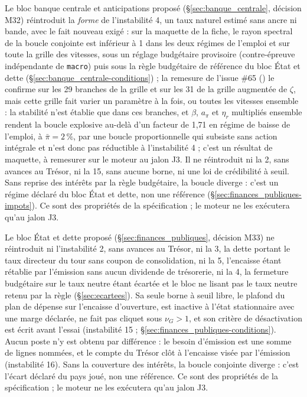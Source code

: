 \documentclass[11pt,a4paper]{article}
\newcommand{\code}[1]{\texttt{\detokenize{#1}}}
\begin{document}
Le bloc banque centrale et anticipations proposé (\S\ref{sec:banque_centrale}, décision M32) réintroduit la \emph{forme} de l'instabilité 4, un taux naturel estimé sans ancre ni bande, avec le fait nouveau exigé : sur la maquette de la fiche, le rayon spectral de la boucle conjointe est inférieur à 1 dans les deux régimes de l'emploi et sur toute la grille des vitesses, sous un réglage budgétaire provisoire (contre-épreuve indépendante de \texttt{macro}) puis sous la règle budgétaire de référence du bloc État et dette (\S\ref{sec:banque_centrale-conditions}) ; la remesure de l'issue \#65 (\code{outils/maquette_conjointe.py}) le confirme sur les 29 branches de la grille et sur les 31 de la grille augmentée de $\zeta$, mais cette grille fait varier un paramètre à la fois, ou toutes les vitesses ensemble : la stabilité n'est établie que dans ces branches, et $\beta$, $a_\pi$ et $\eta_r$ multipliés ensemble rendent la boucle explosive au-delà d'un facteur de 1,71 en régime de baisse de l'emploi, à $\bar\pi = 2\,\%$, par une boucle proportionnelle qui subsiste sans action intégrale et n'est donc pas réductible à l'instabilité 4 ; c'est un résultat de maquette, à remesurer sur le moteur au jalon J3. Il ne réintroduit ni la 2, sans avances au Trésor, ni la 15, sans aucune borne, ni une loi de crédibilité à seuil. Sans reprise des intérêts par la règle budgétaire, la boucle diverge : c'est un régime déclaré du bloc État et dette, non une référence (\S\ref{sec:finances_publiques-impots}). Ce sont des propriétés de la spécification ; le moteur ne les exécutera qu'au jalon J3.

Le bloc État et dette proposé (\S\ref{sec:finances_publiques}, décision M33) ne réintroduit ni l'instabilité 2, sans avances au Trésor, ni la 3, la dette portant le taux directeur du tour sans coupon de consolidation, ni la 5, l'encaisse étant rétablie par l'émission sans aucun dividende de trésorerie, ni la 4, la fermeture budgétaire sur le taux neutre étant écartée et le bloc ne lisant pas le taux neutre retenu par la règle (\S\ref{sec:ecartees}). Sa seule borne à seuil libre, le plafond du plan de dépense sur l'encaisse d'ouverture, est inactive à l'état stationnaire avec une marge déclarée, ne fait pas cliquet sous $\nu_G > 1$, et son critère de désactivation est écrit avant l'essai (instabilité 15 ; \S\ref{sec:finances_publiques-conditions}). Aucun poste n'y est obtenu par différence : le besoin d'émission est une somme de lignes nommées, et le compte du Trésor clôt à l'encaisse visée par l'émission (instabilité 16). Sans la couverture des intérêts, la boucle conjointe diverge : c'est l'écart déclaré du pays joué, non une référence. Ce sont des propriétés de la spécification ; le moteur ne les exécutera qu'au jalon J3.
\end{document}
